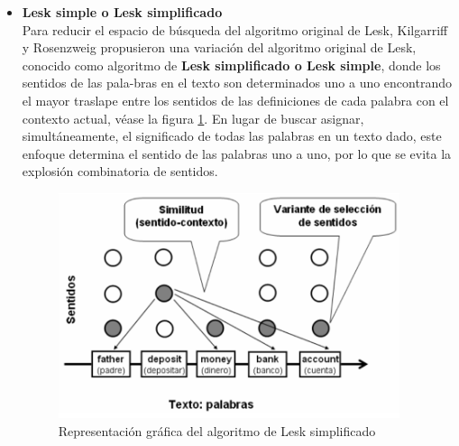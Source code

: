 \begin{itemize}
  \item \textbf{Lesk simple o Lesk simplificado} \\
    Para reducir el espacio de búsqueda del algoritmo original de Lesk, Kilgarriff y Rosenzweig \cite{004} propusieron una variación del algoritmo original de Lesk, conocido como algoritmo de \textbf{Lesk simplificado o Lesk simple}, donde los sentidos de las pala-bras en el texto son determinados uno a uno encontrando el mayor traslape entre los sentidos de las definiciones de cada palabra con el contexto actual, véase la figura \ref{fig:lesk_simple}. En lugar de buscar asignar, simultáneamente, el significado de todas las palabras en un texto dado, este enfoque determina el sentido de las palabras uno a uno, por lo que se evita la explosión combinatoria de sentidos.

    \begin{figure}[h!]
      \begin{center}
      \includegraphics[angle=0, width=10cm]{Graficos/lesk_simple}
      \caption{Representación gráfica del algoritmo de Lesk simplificado \cite{001}}
      \label{fig:lesk_simple}
      \end{center}
    \end{figure}


\end{itemize}

